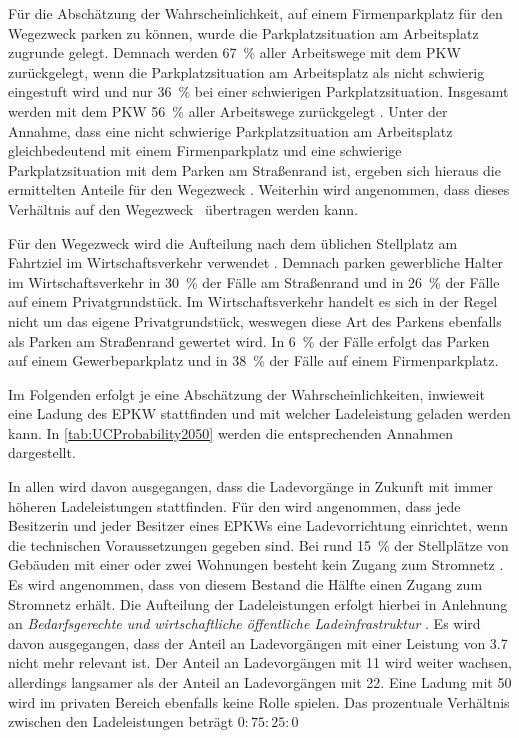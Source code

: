 Für die Abschätzung der Wahrscheinlichkeit, auf einem Firmenparkplatz für den Wegezweck \Arbeit parken zu können, wurde die Parkplatzsituation am Arbeitsplatz zugrunde gelegt.
Demnach werden \SI{67}{\percent} aller Arbeitswege mit dem \gls{PKW} zurückgelegt, wenn die Parkplatzsituation am Arbeitsplatz als nicht schwierig eingestuft wird und nur \SI{36}{\percent} bei einer schwierigen Parkplatzsituation.
Insgesamt werden mit dem \gls{PKW} \SI{56}{\percent} aller Arbeitswege zurückgelegt \cite{Ecke2020}.
Unter der Annahme, dass eine nicht schwierige Parkplatzsituation am Arbeitsplatz gleichbedeutend mit einem Firmenparkplatz und eine schwierige Parkplatzsituation mit dem Parken am Straßenrand ist, ergeben sich hieraus die ermittelten Anteile für den Wegezweck \Arbeitdot.
Weiterhin wird angenommen, dass dieses Verhältnis auf den Wegezweck \Ausbildung~übertragen werden kann.\medskip

Für den Wegezweck \dienst wird die Aufteilung nach dem üblichen Stellplatz am Fahrtziel im Wirtschaftsverkehr verwendet \cite{Rikus2015}.
Demnach parken gewerbliche Halter im Wirtschaftsverkehr in \SI{30}{\percent} der Fälle am Straßenrand und in \SI{26}{\percent} der Fälle auf einem Privatgrundstück.
Im Wirtschaftsverkehr handelt es sich in der Regel nicht um das eigene Privatgrundstück, weswegen diese Art des Parkens ebenfalls als Parken am Straßenrand gewertet wird.
In \SI{6}{\percent} der Fälle erfolgt das Parken auf einem Gewerbeparkplatz und in \SI{38}{\percent} der Fälle auf einem Firmenparkplatz.\medskip

Im Folgenden erfolgt je \UC eine Abschätzung der Wahrscheinlichkeiten, inwieweit eine Ladung des \gls{EPKW} stattfinden und mit welcher Ladeleistung geladen werden kann.
In \autoref{tab:UCProbability2050} werden die entsprechenden Annahmen dargestellt.



In allen \UCs wird davon ausgegangen, dass die Ladevorgänge in Zukunft mit immer höheren Ladeleistungen stattfinden.
Für den \UC \Eigenheim wird angenommen, dass jede Besitzerin und jeder Besitzer eines \glspl{EPKW} eine Ladevorrichtung einrichtet, wenn die technischen Voraussetzungen gegeben sind.
Bei rund \SI{15}{\percent} der Stellplätze von Gebäuden mit einer oder zwei Wohnungen besteht kein Zugang zum Stromnetz \cite{dena2020}.
Es wird angenommen, dass von diesem Bestand die Hälfte einen Zugang zum Stromnetz erhält.
Die Aufteilung der Ladeleistungen erfolgt hierbei in Anlehnung an \textit{Bedarfsgerechte und wirtschaftliche öffentliche Ladeinfrastruktur} \cite{NPZMAVE2020}.
Es wird davon ausgegangen, dass der Anteil an Ladevorgängen mit einer Leistung von \SI{3.7}{\kw} nicht mehr relevant ist.
Der Anteil an Ladevorgängen mit \SI{11}{\kw} wird weiter wachsen, allerdings langsamer als der Anteil an Ladevorgängen mit \SI{22}{\kw}.
Eine Ladung mit \SI{50}{\kw} wird im privaten Bereich ebenfalls keine Rolle spielen.
Das prozentuale Verhältnis zwischen den Ladeleistungen beträgt \(0:75:25:0\)\medskip


